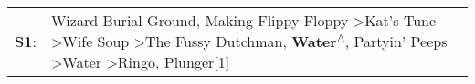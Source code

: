 \begin{supertabular}{p{0.03\textwidth}p{0.92\textwidth}}
 \textbf{S1}:  &  Wizard Burial Ground\textsuperscript{}, \enspace Making Flippy Floppy\textsuperscript{} \textgreater \enspace Kat's Tune\textsuperscript{} \textgreater \enspace Wife Soup\textsuperscript{} \textgreater \enspace The Fussy Dutchman\textsuperscript{}, \enspace \textbf{Water\textsuperscript{$\wedge$}}, \enspace Partyin' Peeps\textsuperscript{} \textgreater \enspace Water\textsuperscript{} \textgreater \enspace Ringo\textsuperscript{}, \enspace Plunger[1]\textsuperscript{}  \enspace  \\
\end{supertabular}

